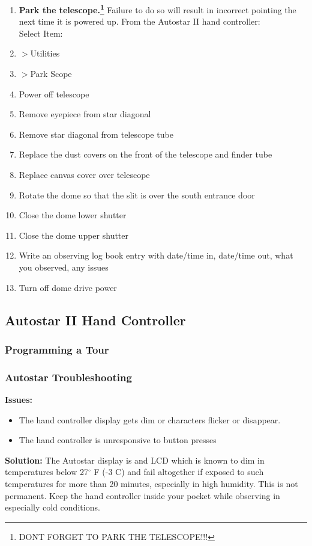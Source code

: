 \documentclass[12pt,titlepage]{article}
\renewcommand\deg{\mbox{$^\circ$}}
\begin{document}
\begin{enumerate}
	\item \textbf{Park the telescope.\footnote[*]{DONT FORGET TO PARK THE TELESCOPE!!!}} Failure to do so will result in incorrect pointing the next time it is powered up. From the Autostar II hand controller:\\
Select Item:
	\item[]\quad $>$Utilities
	\item[]\quad\quad $>$Park Scope
	\label{enum:quickshutdown_start}
	\item Power off telescope
	\item Remove eyepiece from star diagonal
	\item Remove star diagonal from telescope tube
	\item Replace the dust covers on the front of the telescope and finder tube
	\item Replace canvas cover over telescope
	\item Rotate the dome so that the slit is over the south entrance door
	\item Close the dome lower shutter
	\item Close the dome upper shutter
	\item Write an observing log book entry with date/time in, date/time out, what you observed, any issues
	\item Turn off dome drive power
	\label{enum:quickshutdown_end}
\end{enumerate}


\subsection{Autostar II Hand Controller}

\subsubsection{Programming a Tour}

\subsubsection{Autostar Troubleshooting}
\textbf{\flushleft Issues:}
\begin{itemize}
	\item The hand controller display gets dim or characters flicker or disappear.
	\item The hand controller is unresponsive to button presses
\end{itemize}
\textbf{Solution:} The Autostar display is and LCD which is known to dim in temperatures below 27$\deg$ F (-3 C) and fail altogether if exposed to such temperatures for more than 20 minutes, especially in high humidity. This is not permanent. Keep the hand controller inside your pocket while observing in especially cold conditions.
\end{document}
